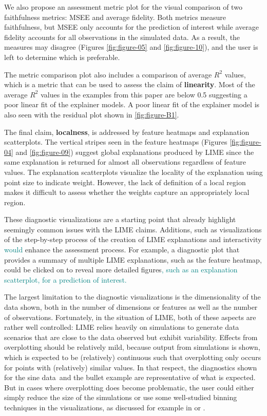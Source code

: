 \documentclass[AMS,STIX2COL]{WileyNJD-v2}\usepackage[]{graphicx}\usepackage[]{color}
\newcommand{\kge}[1]{\textcolor{teal}{#1}}
\newcommand{\data}{sine data}
\renewcommand{\sout}[1]{\unskip}
\begin{document}
We also propose an assessment metric plot for the visual comparison of two faithfulness metrics: MSEE and average fidelity. Both metrics measure faithfulness, but MSEE only accounts for the prediction of interest while average fidelity accounts for all observations in the simulated data. As a result, the measures may disagree (Figures \ref{fig:figure-05} and \ref{fig:figure-10}), and the user is left to determine which is preferable. 

The metric comparison plot also includes a comparison of average $R^2$ values, which is a metric that can be used to assess the claim of \textbf{linearity}. Most of the average $R^2$ values in the examples from this paper are below 0.5 suggesting a poor linear fit of the explainer models. A poor linear fit of the explainer model is also seen with the residual plot shown in \autoref{fig:figure-B1}.

The final claim, \textbf{localness}, is addressed by feature heatmaps and explanation scatterplots. The vertical stripes seen in the feature heatmaps (Figures \ref{fig:figure-04} and \ref{fig:figure-09}) suggest global explanations produced by LIME since the same explanation is returned for almost all observations regardless of feature values. The explanation scatterplots visualize the locality of the explanation using point size to indicate weight. However, the lack of definition of a local region makes it difficult to assess whether the weights capture an appropriately local region.

These diagnostic visualizations are a starting point that already highlight seemingly common issues with the LIME claims. Additions, such as visualizations of the step-by-step process of the creation of LIME explanations and interactivity \kge{would}\sout{,} enhance the assessment process. For example, a diagnostic plot that provides a summary of multiple LIME explanations, such as the feature heatmap, could be \sout{displayed and} clicked on to reveal more detailed figures\kge{, such as an explanation scatterplot, for a prediction of interest.}\sout{ associated with individual prediction of interest, such as an explanation scatterplot.}

The largest limitation to the diagnostic visualizations is the dimensionality of the data shown, both in the number of dimensions or features as well as the number of observations. Fortunately, in the situation of LIME, both of these aspects are rather well controlled: LIME relies heavily on simulations to generate data scenarios that are close to the data observed but exhibit variability. Effects from overplotting should be relatively mild, because output from simulations is shown, which is expected to be (relatively) continuous such that overplotting only occurs for points with (relatively) similar values. In that respect, the diagnostics shown for the \data \ and the bullet example are representative of what is expected. But in cases where overplotting does become problematic, the user could either simply reduce the size of the simulations or use some well-studied binning techniques in the visualizations, as discussed for example in \citet{carr:1987} or \citet{unwin:2006}. 
\end{document}
